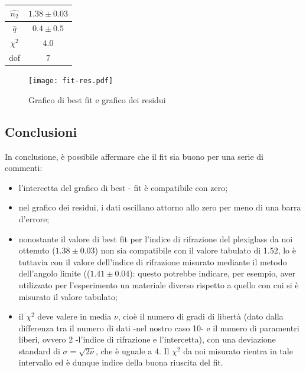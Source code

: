 \documentclass{article}
\begin{document}
\begin{center}
    \begin{tabular}{c|c}
    \toprule
    $\hat{n_2}$ & $1.38 \pm 0.03$  \\
    \midrule
    $\hat{q}$ & $0.4 \pm 0.5$ \\
    \midrule
    $\chi^2$ & 4.0\\
    \midrule
    dof & 7\\
    \bottomrule
\end{tabular}
\end{center}

\begin{figure} [H]
    \centering
    \texttt{[image: fit-res.pdf]}
    \caption{Grafico di best fit e grafico dei residui}
    \label{fig:my_label}
\end{figure}

\vspace{2em}

\subsection{Conclusioni} %
In conclusione, è possibile affermare che il fit sia buono per una serie di commenti:

\begin{itemize}
    \item l'intercetta del grafico di best - fit è compatibile con zero;
    \item nel grafico dei residui, i dati oscillano attorno allo zero per meno di una barra d'errore; %
    \item nonostante il valore di best fit per l'indice di rifrazione del plexiglass da noi ottenuto ($1.38 \pm 0.03$) non sia compatibile con il valore tabulato di 1.52, lo è tuttavia con il valore dell'indice di rifrazione misurato mediante il metodo dell'angolo limite (($1.41 \pm 0.04$): questo potrebbe indicare, per esempio, aver utilizzato per l'esperimento un materiale diverso rispetto a quello con cui si è misurato il valore tabulato;
    \item il $\chi^2$ deve valere in media $\nu$, cioè il numero di gradi di libertà (dato dalla differenza tra il numero di dati -nel nostro caso 10- e il numero di paramentri liberi, ovvero 2 -l'indice di rifrazione e l'intercetta), con una deviazione standard di $\sigma = \sqrt{2\nu}$, che è uguale a 4. Il $\chi^2$ da noi misurato rientra in tale intervallo ed è dunque indice della buona riuscita del fit.
\end{itemize}
\end{document}
